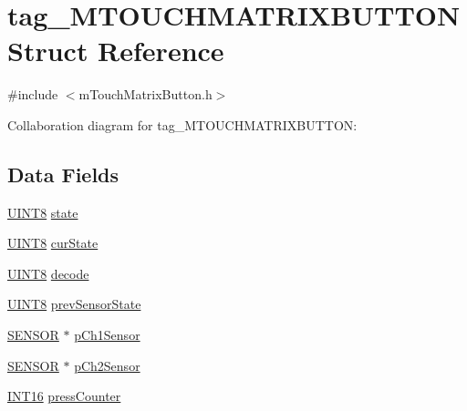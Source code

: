 \hypertarget{structtag___m_t_o_u_c_h_m_a_t_r_i_x_b_u_t_t_o_n}{}\section{tag\+\_\+\+M\+T\+O\+U\+C\+H\+M\+A\+T\+R\+I\+X\+B\+U\+T\+T\+O\+N Struct Reference}
\label{structtag___m_t_o_u_c_h_m_a_t_r_i_x_b_u_t_t_o_n}


{\ttfamily \#include $<$m\+Touch\+Matrix\+Button.\+h$>$}



Collaboration diagram for tag\+\_\+\+M\+T\+O\+U\+C\+H\+M\+A\+T\+R\+I\+X\+B\+U\+T\+T\+O\+N\+:
\subsection*{Data Fields}
\begin{DoxyCompactItemize}
\item 
\hyperlink{_generic_type_defs_8h_ab27e9918b538ce9d8ca692479b375b6a}{U\+I\+N\+T8} \hyperlink{structtag___m_t_o_u_c_h_m_a_t_r_i_x_b_u_t_t_o_n_a6e9c4cbd32a1178b12f3a61f6855c896}{state}
\item 
\hyperlink{_generic_type_defs_8h_ab27e9918b538ce9d8ca692479b375b6a}{U\+I\+N\+T8} \hyperlink{structtag___m_t_o_u_c_h_m_a_t_r_i_x_b_u_t_t_o_n_a0d7d80e094daab6b1e4fbcbd4c408e6f}{cur\+State}
\item 
\hyperlink{_generic_type_defs_8h_ab27e9918b538ce9d8ca692479b375b6a}{U\+I\+N\+T8} \hyperlink{structtag___m_t_o_u_c_h_m_a_t_r_i_x_b_u_t_t_o_n_a0d1a1d2d83a29c80a29bccf13569a630}{decode}
\item 
\hyperlink{_generic_type_defs_8h_ab27e9918b538ce9d8ca692479b375b6a}{U\+I\+N\+T8} \hyperlink{structtag___m_t_o_u_c_h_m_a_t_r_i_x_b_u_t_t_o_n_ae404837b36327a7f5dc7ec0945a80d8e}{prev\+Sensor\+State}
\item 
\hyperlink{m_touch_sensor_8h_a20ea6ae73be2b43f0c39bae385b66266}{S\+E\+N\+S\+O\+R} $\ast$ \hyperlink{structtag___m_t_o_u_c_h_m_a_t_r_i_x_b_u_t_t_o_n_a41f98368630f8a733591c707f8dba5fb}{p\+Ch1\+Sensor}
\item 
\hyperlink{m_touch_sensor_8h_a20ea6ae73be2b43f0c39bae385b66266}{S\+E\+N\+S\+O\+R} $\ast$ \hyperlink{structtag___m_t_o_u_c_h_m_a_t_r_i_x_b_u_t_t_o_n_a4d88a2538150ca92e2086160c812d5a4}{p\+Ch2\+Sensor}
\item 
\hyperlink{_generic_type_defs_8h_ad87465075f24df28ef66f25e43f0bd5a}{I\+N\+T16} \hyperlink{structtag___m_t_o_u_c_h_m_a_t_r_i_x_b_u_t_t_o_n_ad2b17e3a502fe8732111c3773fbbbc0b}{press\+Counter}
\end{DoxyCompactItemize}


